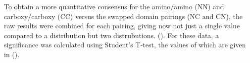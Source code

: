 To obtain a more quantitative consensus
for the amino/amino (NN) and carboxy/carboxy (CC) versus the swapped domain pairings
(NC and CN), the raw results were combined for each pairing, giving now not just a
single value compared to a distribution but two distrubutions. ().   For these data,
a significance was calculated using Student's T-test, the values of which are given
in ().

%
%
%


